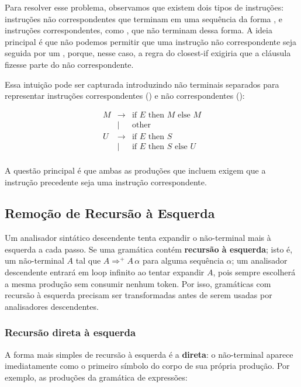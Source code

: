   Para resolver esse problema, observamos que existem dois tipos de
  instruções: instruções não correspondentes que terminam em uma
  sequência da forma , e instruções
  correspondentes, como ,
  que não terminam dessa forma. A ideia principal é que não podemos
  permitir que uma instrução não correspondente seja seguida por um
  , porque, nesse caso, a regra do
  closest-if exigiria que a cláusula
   fizesse parte do
   não correspondente.

  Essa intuição pode ser capturada introduzindo não terminais separados
  para representar instruções correspondentes
  () e não correspondentes
  ():

  \[
    \begin{array}{lcl}
      M & \to  & \textrm{if }E\textrm{ then }M\textrm{ else }M\\
      & \mid & \textrm{other}\\
      U & \to  & \textrm{if } E \textrm{ then } S\\
      & \mid & \textrm{if } E \textrm{ then } S\textrm{ else }U\\
    \end{array}
  \]

  A questão principal é que ambas as produções que incluem
   exigem que a instrução precedente seja
  uma instrução correspondente.

  \subsection{Remoção de Recursão à Esquerda}

  Um analisador sintático descendente tenta expandir o não-terminal
  mais à esquerda a cada passo. Se uma gramática contém
  \textbf{recursão à esquerda}; isto é, um não-terminal \(A\) tal
  que \(A \Rightarrow^+ A\,\alpha\) para alguma sequência \(\alpha\);
  um analisador descendente entrará em loop infinito ao tentar
  expandir \(A\), pois sempre escolherá a mesma produção sem consumir
  nenhum token. Por isso, gramáticas com recursão à esquerda precisam
  ser transformadas antes de serem usadas por analisadores descendentes.

  \subsubsection{Recursão direta à esquerda}

  A forma mais simples de recursão à esquerda é a \textbf{direta}: o
  não-terminal aparece imediatamente como o primeiro símbolo do corpo
  de sua própria produção. Por exemplo, as produções da gramática de expressões:

